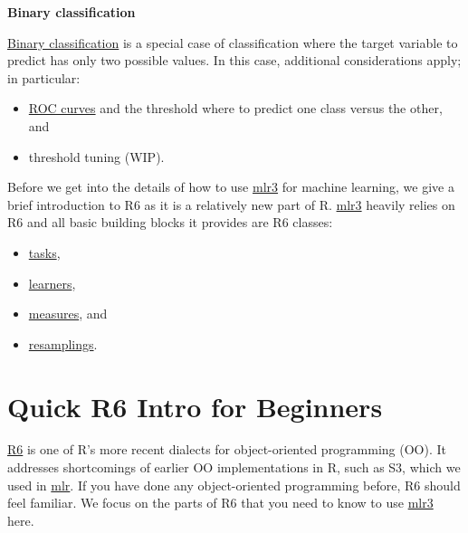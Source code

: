 \documentclass[
]{scrbook}
\providecommand{\tightlist}{%
  \setlength{\itemsep}{0pt}\setlength{\parskip}{0pt}}
\begin{document}
\textbf{Binary classification}

\protect\hyperlink{binary-classification}{Binary classification} is a special case of classification where the target variable to predict has only two possible values.
In this case, additional considerations apply; in particular:

\begin{itemize}
\tightlist
\item
  \protect\hyperlink{binary-roc}{ROC curves} and the threshold where to predict one class versus the other, and
\item
  threshold tuning (WIP).
\end{itemize}

Before we get into the details of how to use \href{https://mlr3.mlr-org.com}{mlr3} for machine learning, we give a brief introduction to R6 as it is a relatively new part of R.
\href{https://mlr3.mlr-org.com}{mlr3} heavily relies on R6 and all basic building blocks it provides are R6 classes:

\begin{itemize}
\tightlist
\item
  \protect\hyperlink{tasks}{tasks},
\item
  \protect\hyperlink{learners}{learners},
\item
  \protect\hyperlink{list-measures}{measures}, and
\item
  \protect\hyperlink{resampling}{resamplings}.
\end{itemize}

\hypertarget{r6}{%
\section{Quick R6 Intro for Beginners}\label{r6}}

\href{https://cran.r-project.org/package=R6}{R6} is one of R's more recent dialects for object-oriented programming (OO).
It addresses shortcomings of earlier OO implementations in R, such as S3, which we used in \href{https://mlr.mlr-org.com}{mlr}.
If you have done any object-oriented programming before, R6 should feel familiar.
We focus on the parts of R6 that you need to know to use \href{https://mlr3.mlr-org.com}{mlr3} here.
\end{document}

